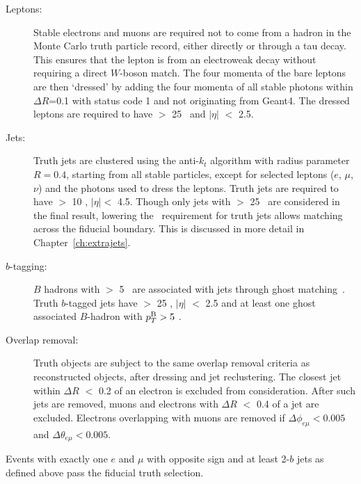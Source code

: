 \begin{description}
\item[Leptons:] Stable electrons and muons are required not to come from a hadron in the Monte Carlo truth particle record, either directly or through a tau decay. This ensures that the lepton is from an electroweak decay without requiring a direct $W$-boson match. The four momenta of the bare leptons are then `dressed' by adding the four momenta of all stable photons within $\Delta R$=0.1 with status code 1 and not originating from Geant4. The dressed leptons are required to have \pt $>$ 25 \GeV\ and $|\eta|$ $<$ 2.5.
\item[Jets:] Truth jets are clustered using the anti-$k_t$ algorithm  with radius parameter $R=0.4$, starting from all stable particles, except for selected leptons ($e$, $\mu$, $\nu$) and the photons used to dress the leptons. Truth jets are required to have \pT $>$ 10 \GeV, $|\eta| <$ 4.5. Though only jets with \pT $>$ 25 \GeV\ are considered in the final result, lowering the \pt\ requirement for truth jets allows matching across the fiducial boundary. This is discussed in more detail in Chapter~\ref{ch:extrajets}.

\item[$b$-tagging:] $B$ hadrons with \pT $>$ 5 \GeV\ are associated with jets through ghost matching~\cite{ghostmatch}. Truth $b$-tagged jets have \pT $>$ 25 \GeV, $|\eta|$ $<$ 2.5 and at least one ghost associated $B$-hadron with $p^{{\textrm B}}_{T} > 5$ \GeV.

\item[Overlap removal:] Truth objects are subject to the same overlap removal criteria as reconstructed objects, after dressing and jet reclustering. The closest jet within $\Delta R$ $<$ 0.2 of an electron is excluded from consideration.  After such jets are removed, 
muons  and electrons with $\Delta R$ $<$ 0.4 of a jet are excluded. Electrons overlapping with muons are removed if $\Delta \phi_{e\mu} < 0.005$ and $\Delta \theta_{e\mu} < 0.005$.
\end{description}


Events with exactly one $e$ and $\mu$ with opposite sign and at least 2-$b$ jets as defined above pass the fiducial truth selection.

